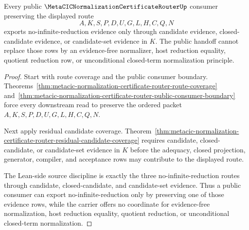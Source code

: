 \begin{theorem}
\label{thm:metacic-normalization-certificate-router-no-infinite-reduction-public-handoff}
Every public $\MetaCICNormalizationCertificateRouterUp$ consumer preserving the displayed route
$$
A,K,S,P,D,U,G,L,H,C,Q,N
$$
exports no-infinite-reduction evidence only through candidate evidence, closed-candidate evidence, or candidate-set evidence in $K$. The public handoff cannot replace those rows by an evidence-free normalizer, host reduction equality, quotient reduction row, or unconditional closed-term normalization principle.
\end{theorem}
\begin{proof}
Start with route coverage and the public consumer boundary. Theorems~\ref{thm:metacic-normalization-certificate-router-route-coverage} and~\ref{thm:metacic-normalization-certificate-router-public-consumer-boundary} force every downstream read to preserve the ordered packet $A,K,S,P,D,U,G,L,H,C,Q,N$.

Next apply residual candidate coverage. Theorem~\ref{thm:metacic-normalization-certificate-router-residual-candidate-coverage} requires candidate, closed-candidate, or candidate-set evidence in $K$ before the adequacy, closed projection, generator, compiler, and acceptance rows may contribute to the displayed route.

The Lean-side source discipline is exactly the three no-infinite-reduction routes through candidate, closed-candidate, and candidate-set evidence. Thus a public consumer can export no-infinite-reduction only by preserving one of those evidence rows, while the carrier offers no coordinate for evidence-free normalization, host reduction equality, quotient reduction, or unconditional closed-term normalization.
\end{proof}


